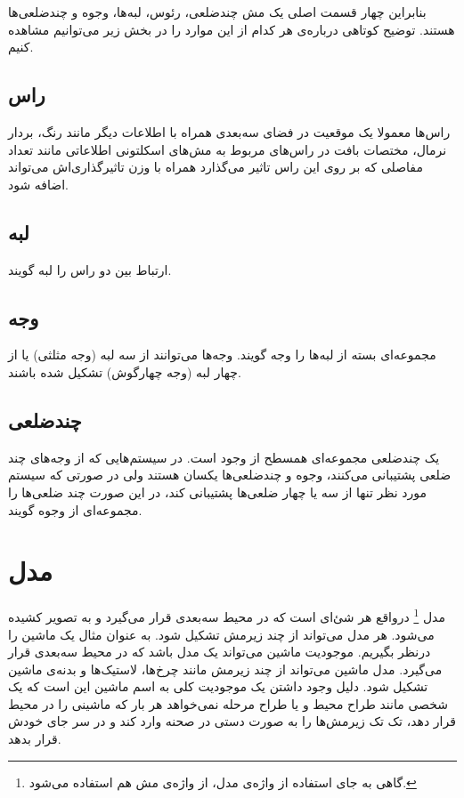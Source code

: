 بنابراین چهار قسمت اصلی یک مش چندضلعی، رئوس، لبه‌ها، وجوه و چندضلعی‌ها هستند. توضیح کوتاهی درباره‌ی هر کدام از این موارد را در بخش زیر می‌توانیم مشاهده کنیم.

\subsection{راس}
راس‌ها معمولا یک موقعیت در فضای سه‌بعدی همراه با اطلاعات دیگر مانند رنگ، بردار نرمال، مختصات بافت 
در راس‌های مربوط به مش‌های اسکلتونی اطلاعاتی مانند تعداد مفاصلی که بر روی این راس تاثیر می‌گذارد همراه با وزن تاثیرگذاری‌اش می‌تواند اضافه شود.

\subsection{لبه}
ارتباط بین دو راس را لبه گویند.

\subsection{وجه}
مجموعه‌ای بسته از لبه‌ها را وجه گویند. وجه‌ها می‌توانند از سه لبه 
(وجه مثلثی)
یا از چهار لبه
(وجه چهارگوش)
تشکیل شده باشند.

\subsection{چندضلعی}
یک چندضلعی مجموعه‌ای همسطح از وجود است.
در سیستم‌هایی که از وجه‌های چند ضلعی پشتیبانی می‌کنند، وجوه و چندضلعی‌ها یکسان هستند ولی در صورتی که سیستم مورد نظر تنها از سه یا چهار ضلعی‌ها پشتیبانی کند، در این صورت چند ضلعی‌ها را مجموعه‌ای از وجوه گویند.

\section{مدل}

مدل‌
\footnote{ گاهی به جای استفاده از واژه‌ی مدل، از واژه‌ی مش هم استفاده می‌شود.}
درواقع هر شئ‌ای است که در محیط سه‌بعدی قرار می‌گیرد و به تصویر کشیده ‌می‌شود. هر مدل می‌تواند از چند زیرمش تشکیل شود.
به عنوان مثال یک ماشین را درنظر بگیریم. موجودیت ماشین می‌تواند یک مدل باشد که در محیط سه‌بعدی قرار می‌گیرد. مدل ماشین می‌تواند از چند زیرمش مانند چرخ‌ها، لاستیک‌ها و بدنه‌ی ماشین تشکیل شود. دلیل وجود داشتن یک موجودیت کلی به اسم ماشین این است که یک ‌شخصی مانند طراح محیط و یا طراح مرحله ‌نمی‌خواهد هر بار که ماشینی را در محیط قرار دهد، تک تک زیرمش‌ها را به صورت دستی در صحنه وارد کند و در سر جای خودش قرار بدهد.


